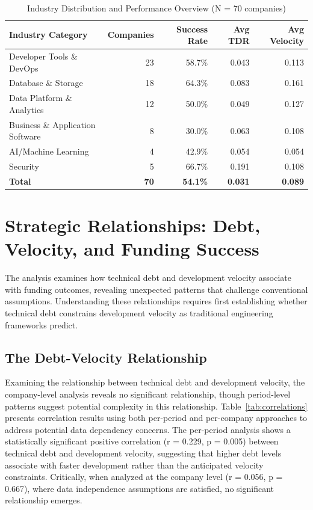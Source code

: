 \begin{table}[htbp]
\centering
\caption{Industry Distribution and Performance Overview (N = 70 companies)}
\label{tab:industry_distribution_results}
\begin{tabular}{lrrrr}
\hline
\textbf{Industry Category} & \textbf{Companies} & \textbf{Success Rate} & \textbf{Avg TDR} & \textbf{Avg Velocity} \\
\hline
Developer Tools \& DevOps & 23 & 58.7\% & 0.043 & 0.113 \\
Database \& Storage & 18 & 64.3\% & 0.083 & 0.161 \\
Data Platform \& Analytics & 12 & 50.0\% & 0.049 & 0.127 \\
Business \& Application Software & 8 & 30.0\% & 0.063 & 0.108 \\
AI/Machine Learning & 4 & 42.9\% & 0.054 & 0.054 \\
Security & 5 & 66.7\% & 0.191 & 0.108 \\
\hline
\textbf{Total} & \textbf{70} & \textbf{54.1\%} & \textbf{0.031} & \textbf{0.089} \\
\hline
\end{tabular}
\end{table}

\section{Strategic Relationships: Debt, Velocity, and Funding Success}\label{sec:primary_relationships}

The analysis examines how technical debt and development velocity associate with funding outcomes, revealing unexpected patterns that challenge conventional assumptions. Understanding these relationships requires first establishing whether technical debt constrains development velocity as traditional engineering frameworks predict.

\subsection{The Debt-Velocity Relationship}

Examining the relationship between technical debt and development velocity, the company-level analysis reveals no significant relationship, though period-level patterns suggest potential complexity in this relationship. Table~\ref{tab:correlations} presents correlation results using both per-period and per-company approaches to address potential data dependency concerns. The per-period analysis shows a statistically significant positive correlation (r = 0.229, p = 0.005) between technical debt and development velocity, suggesting that higher debt levels associate with faster development rather than the anticipated velocity constraints. Critically, when analyzed at the company level (r = 0.056, p = 0.667), where data independence assumptions are satisfied, no significant relationship emerges.

